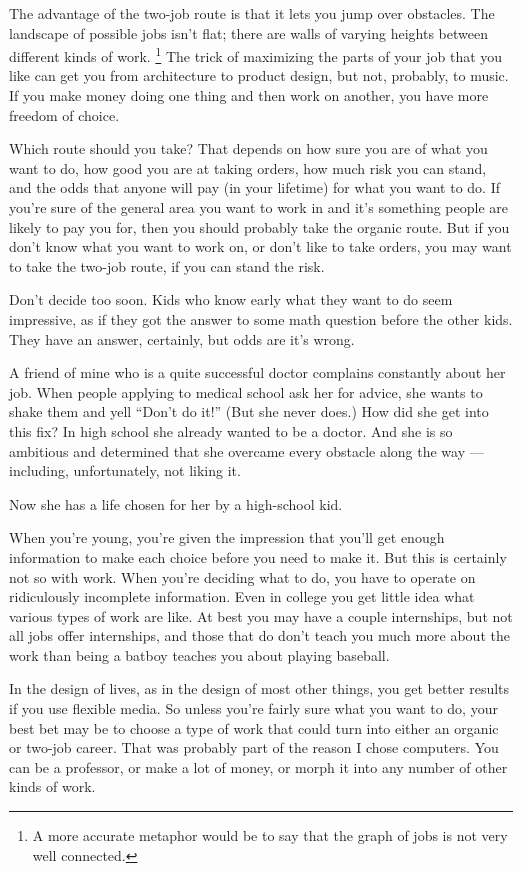 \documentclass[12pt]{book}
\begin{document}
The advantage of the two-job route is that it lets you jump over
obstacles. The landscape of possible jobs isn't flat; there are walls of
varying heights between different kinds of work. \footnote{A more accurate metaphor would be to say that the graph of jobs
is not very well connected.}
The trick of maximizing the parts of your job that you like can get you
from architecture to product design, but not, probably, to music. If you
make money doing one thing and then work on another, you have more
freedom of choice.

Which route should you take? That depends on how sure you are of what
you want to do, how good you are at taking orders, how much risk you can
stand, and the odds that anyone will pay (in your lifetime) for what you
want to do. If you're sure of the general area you want to work in and
it's something people are likely to pay you for, then you should
probably take the organic route. But if you don't know what you want to
work on, or don't like to take orders, you may want to take the two-job
route, if you can stand the risk.

Don't decide too soon. Kids who know early what they want to do seem
impressive, as if they got the answer to some math question before the
other kids. They have an answer, certainly, but odds are it's wrong.

A friend of mine who is a quite successful doctor complains constantly
about her job. When people applying to medical school ask her for
advice, she wants to shake them and yell ``Don't do it!'' (But she never
does.) How did she get into this fix? In high school she already wanted
to be a doctor. And she is so ambitious and determined that she overcame
every obstacle along the way --- including, unfortunately, not liking
it.

Now she has a life chosen for her by a high-school kid.

When you're young, you're given the impression that you'll get enough
information to make each choice before you need to make it. But this is
certainly not so with work. When you're deciding what to do, you have to
operate on ridiculously incomplete information. Even in college you get
little idea what various types of work are like. At best you may have a
couple internships, but not all jobs offer internships, and those that
do don't teach you much more about the work than being a batboy teaches
you about playing baseball.

In the design of lives, as in the design of most other things, you get
better results if you use flexible media. So unless you're fairly sure
what you want to do, your best bet may be to choose a type of work that
could turn into either an organic or two-job career. That was probably
part of the reason I chose computers. You can be a professor, or make a
lot of money, or morph it into any number of other kinds of work.
\end{document}
